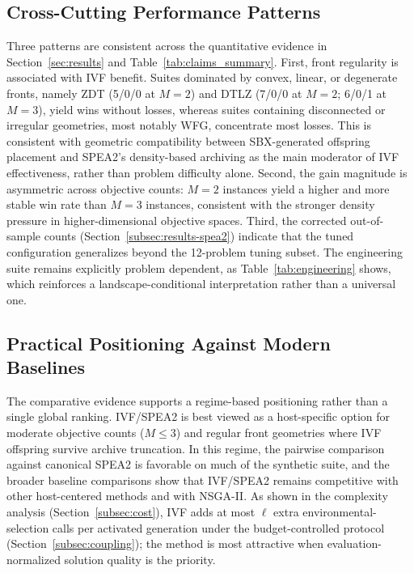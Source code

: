 \documentclass[pdflatex,sn-mathphys-ay]{sn-jnl}%
\theoremstyle{thmstyleone}%
\theoremstyle{thmstyletwo}%
\theoremstyle{thmstylethree}%
\begin{document}
\subsection{Cross-Cutting Performance Patterns}\label{subsec:discussion-patterns}
Three patterns are consistent across the quantitative evidence in Section~\ref{sec:results} and Table~\ref{tab:claims_summary}. First, front regularity is associated with IVF benefit. Suites dominated by convex, linear, or degenerate fronts, namely ZDT (5/0/0 at $M{=}2$) and DTLZ (7/0/0 at $M{=}2$; 6/0/1 at $M{=}3$), yield wins without losses, whereas suites containing disconnected or irregular geometries, most notably WFG, concentrate most losses. This is consistent with geometric compatibility between SBX-generated offspring placement and SPEA2's density-based archiving as the main moderator of IVF effectiveness, rather than problem difficulty alone. Second, the gain magnitude is asymmetric across objective counts: $M=2$ instances yield a higher and more stable win rate than $M=3$ instances, consistent with the stronger density pressure in higher-dimensional objective spaces. Third, the corrected out-of-sample counts (Section~\ref{subsec:results-spea2}) indicate that the tuned configuration generalizes beyond the 12-problem tuning subset. The engineering suite remains explicitly problem dependent, as Table~\ref{tab:engineering} shows, which reinforces a landscape-conditional interpretation rather than a universal one.

\subsection{Practical Positioning Against Modern Baselines}\label{subsec:discussion-positioning}
The comparative evidence supports a regime-based positioning rather than a single global ranking. IVF/SPEA2 is best viewed as a host-specific option for moderate objective counts ($M \le 3$) and regular front geometries where IVF offspring survive archive truncation. In this regime, the pairwise comparison against canonical SPEA2 is favorable on much of the synthetic suite, and the broader baseline comparisons show that IVF/SPEA2 remains competitive with other host-centered methods and with NSGA-II. As shown in the complexity analysis (Section~\ref{subsec:cost}), IVF adds at most $\ell$ extra environmental-selection calls per activated generation under the budget-controlled protocol (Section~\ref{subsec:coupling}); the method is most attractive when evaluation-normalized solution quality is the priority.
\end{document}
